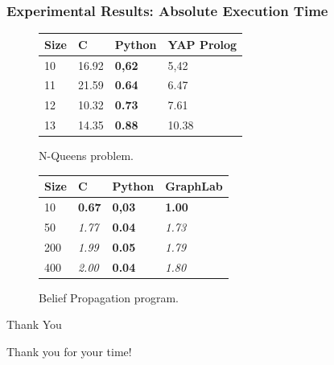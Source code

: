 \documentclass{beamer}
\begin{document}
\begin{frame}[fragile]
   \frametitle{Experimental Results: Absolute Execution Time}
   \begin{figure}[b]
      \begin{tabular}{ | l | l | l | l |}
       \hline

       Size & C & Python & YAP Prolog \\ \hline\hline
       10 & 16.92 & \textbf{0,62} & 5,42 \\
       11 & 21.59 & \textbf{0.64} & 6.47 \\
       12 & 10.32 & \textbf{0.73} & 7.61 \\
       13 & 14.35 & \textbf{0.88} & 10.38 \\
       \hline
       \end{tabular}
       \caption{N-Queens problem.}
    \end{figure}
    \begin{figure}[b]
       \begin{tabular}{ | l | l | l | l |}
        \hline

        Size & C & Python & GraphLab \\ \hline\hline
        10 & \textbf{0.67} & \textbf{0,03} & \textbf{1.00} \\
        50 & \textit{1.77} & \textbf{0.04} & \textit{1.73} \\
        200 & \textit{1.99} & \textbf{0.05} & \textit{1.79} \\
        400 & \textit{2.00} & \textbf{0.04} & \textit{1.80} \\
        \hline
        \end{tabular}
        \caption{Belief Propagation program.}
    \end{figure}
\end{frame}


\begin{frame}{Thank You}
\begin{center}
{\Huge Thank you for your time!}
\end{center}
\end{frame}
\end{document}
